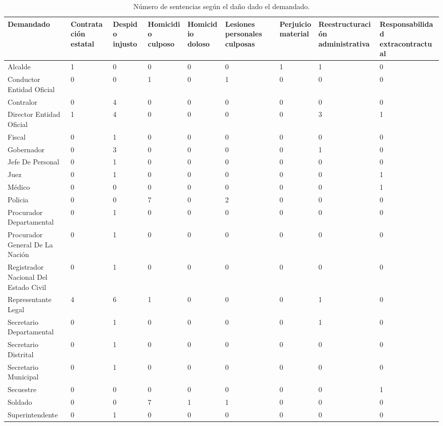 \begin{sidewaystable}[!htbp]
\centering
\caption{Número de sentencias según el daño dado el demandado.} 
\label{tab:danodemandado}
\begin{tabular}{p{5cm}R{2cm}R{2cm}R{2cm}R{2cm}R{2cm}R{2cm}R{2cm}R{2cm}}
  \hline
Demandado & Contratación estatal & Despido injusto & Homicidio culposo & Homicidio doloso & Lesiones personales culposas & Perjuicio material & Reestructuración administrativa & Responsabilidad extracontractual \\ 
  \hline
Alcalde &  1 &  0 &  0 &  0 &  0 &  1 &  1 &  0 \\ 
  Conductor Entidad Oficial &  0 &  0 &  1 &  0 &  1 &  0 &  0 &  0 \\ 
  Contralor &  0 &  4 &  0 &  0 &  0 &  0 &  0 &  0 \\ 
  Director Entidad Oficial &  1 &  4 &  0 &  0 &  0 &  0 &  3 &  1 \\ 
  Fiscal &  0 &  1 &  0 &  0 &  0 &  0 &  0 &  0 \\ 
  Gobernador &  0 &  3 &  0 &  0 &  0 &  0 &  1 &  0 \\ 
  Jefe De Personal &  0 &  1 &  0 &  0 &  0 &  0 &  0 &  0 \\ 
  Juez &  0 &  1 &  0 &  0 &  0 &  0 &  0 &  1 \\ 
  Médico &  0 &  0 &  0 &  0 &  0 &  0 &  0 &  1 \\ 
  Policia &  0 &  0 &  7 &  0 &  2 &  0 &  0 &  0 \\ 
  Procurador Departamental &  0 &  1 &  0 &  0 &  0 &  0 &  0 &  0 \\ 
  Procurador General De La Nación &  0 &  1 &  0 &  0 &  0 &  0 &  0 &  0 \\ 
  Registrador Nacional Del Estado Civil &  0 &  1 &  0 &  0 &  0 &  0 &  0 &  0 \\ 
  Representante Legal &  4 &  6 &  1 &  0 &  0 &  0 &  1 &  0 \\ 
  Secretario Departamental &  0 &  1 &  0 &  0 &  0 &  0 &  1 &  0 \\ 
  Secretario Distrital &  0 &  1 &  0 &  0 &  0 &  0 &  0 &  0 \\ 
  Secretario Municipal &  0 &  1 &  0 &  0 &  0 &  0 &  0 &  0 \\ 
  Secuestre &  0 &  0 &  0 &  0 &  0 &  0 &  0 &  1 \\ 
  Soldado &  0 &  0 &  7 &  1 &  1 &  0 &  0 &  0 \\ 
  Superintendente &  0 &  1 &  0 &  0 &  0 &  0 &  0 &  0 \\ 
   \hline
\end{tabular}
\end{sidewaystable}
